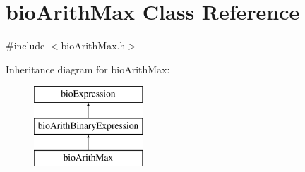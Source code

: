 \hypertarget{classbio_arith_max}{}\section{bio\+Arith\+Max Class Reference}
\label{classbio_arith_max}


{\ttfamily \#include $<$bio\+Arith\+Max.\+h$>$}

Inheritance diagram for bio\+Arith\+Max\+:\begin{figure}[H]
\begin{center}
\leavevmode
\includegraphics[height=3.000000cm]{classbio_arith_max}
\end{center}
\end{figure}
